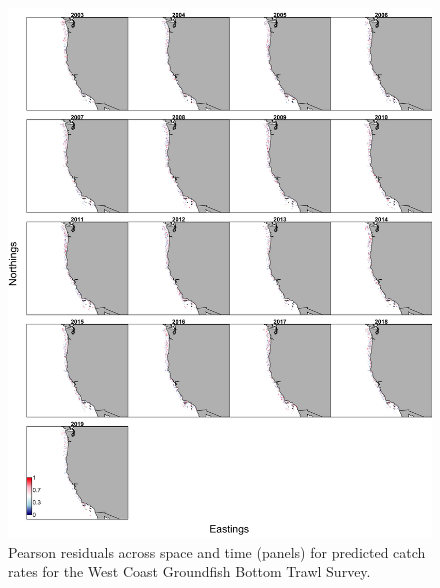 \documentclass[11pt,
  english,
  a4paper,
]{article}
\begin{document}
\tagmcend\tagstructend


\begin{figure}
\centering
\includegraphics[width=1\textwidth,height=1\textheight]{figs/quantile_residuals_on_map.png}
\caption{Pearson residuals across space and time (panels) for predicted catch rates for the West Coast Groundfish Bottom Trawl Survey. \label{fig:surveyresid1WCGBT1}}
\end{figure}

\tagmcend\tagstructend

\end{document}
